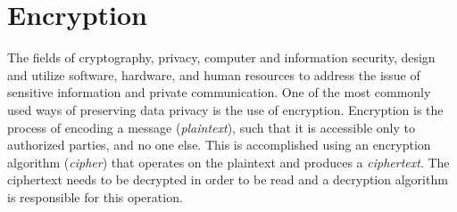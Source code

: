\section{Encryption}\label{s:encryption}
The fields of cryptography, privacy, computer and information security, design and utilize software, hardware, and human resources to address the issue of sensitive information and private communication.
One of the most commonly used ways of preserving data privacy is the use of encryption. Encryption is the process of encoding a message (\emph{plaintext}), such that it is accessible only to authorized parties, and no one else.
This is accomplished using an encryption algorithm (\emph{cipher}) that operates on the plaintext and produces a \emph{ciphertext}.
The ciphertext needs to be decrypted in order to be read and a decryption algorithm is responsible for this operation.

